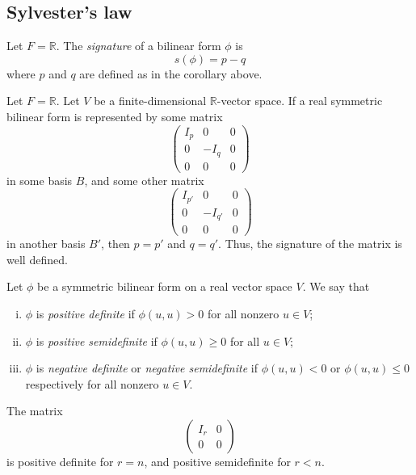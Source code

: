 \subsection{Sylvester's law}
\begin{definition}
	Let \( F = \mathbb R \).
	The \textit{signature} of a bilinear form \( \phi \) is
	\[
		s(\phi) = p - q
	\]
	where \( p \) and \( q \) are defined as in the corollary above.
\end{definition}
\begin{theorem}
	Let \( F = \mathbb R \).
	Let \( V \) be a finite-dimensional \( \mathbb R \)-vector space.
	If a real symmetric bilinear form is represented by some matrix
	\[
		\begin{pmatrix}
			I_p & 0    & 0 \\
			0   & -I_q & 0 \\
			0   & 0    & 0
		\end{pmatrix}
	\]
	in some basis \( B \), and some other matrix
	\[
		\begin{pmatrix}
			I_{p'} & 0       & 0 \\
			0      & -I_{q'} & 0 \\
			0      & 0       & 0
		\end{pmatrix}
	\]
	in another basis \( B' \), then \( p = p' \) and \( q = q' \).
	Thus, the signature of the matrix is well defined.
\end{theorem}
\begin{definition}
	Let \( \phi \) be a symmetric bilinear form on a real vector space \( V \).
	We say that
	\begin{enumerate}[(i)]
		\item \( \phi \) is \textit{positive definite} if \( \phi(u,u) > 0 \) for all nonzero \( u \in V \);
		\item \( \phi \) is \textit{positive semidefinite} if \( \phi(u,u) \geq 0 \) for all \( u \in V \);
		\item \( \phi \) is \textit{negative definite} or \textit{negative semidefinite} if \( \phi(u,u) < 0 \) or \( \phi(u,u) \leq 0 \) respectively for all nonzero \( u \in V \).
	\end{enumerate}
\end{definition}
\begin{example}
	The matrix
	\[
		\begin{pmatrix}
			I_r & 0 \\
			0   & 0
		\end{pmatrix}
	\]
	is positive definite for \( r = n \), and positive semidefinite for \( r < n \).
\end{example}
